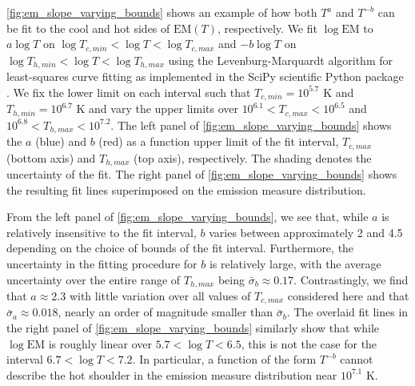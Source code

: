 \documentclass[apj]{emulateapj}
\begin{document}
	\par\autoref{fig:em_slope_varying_bounds} shows an example of how both $T^a$ and $T^{-b}$ can be fit to the cool and hot sides of $\mathrm{EM}(T)$, respectively. We fit $\log{\mathrm{EM}}$ to $a\log{T}$ on $\log{T_{c,min}}<\log{T}<\log{T_{c,max}}$ and $-b\log{T}$ on $\log{T_{h,min}}<\log{T}<\log{T_{h,max}}$ using the Levenburg-Marquardt algorithm for least-squares curve fitting as implemented in the SciPy scientific Python package \citep{van_der_walt_numpy_2011}. We fix the lower limit on each interval such that $T_{c,min}=10^{5.7}$ K and $T_{h,min} = 10^{6.7}$  K and vary the upper limits over $10^{6.1}<T_{c,max}<10^{6.5}$ and $10^{6.8}<T_{h,max}<10^{7.2}$. The left panel of \autoref{fig:em_slope_varying_bounds} shows the $a$ (blue) and $b$ (red) as a function upper limit of the fit interval, $T_{c,max}$ (bottom axis) and $T_{h,max}$ (top axis), respectively. The shading denotes the uncertainty of the fit. The right panel of \autoref{fig:em_slope_varying_bounds} shows the resulting fit lines superimposed on the emission measure distribution.
	\par From the left panel of \autoref{fig:em_slope_varying_bounds}, we see that, while $a$ is relatively insensitive to the fit interval, $b$ varies between approximately 2 and 4.5 depending on the choice of bounds of the fit interval. Furthermore, the uncertainty in the fitting procedure for $b$ is relatively large, with the average uncertainty over the entire range of $T_{h,max}$ being $\bar{\sigma}_b\approx0.17$.  Contrastingly, we find that $a\approx2.3$ with little variation over all values of $T_{c,max}$ considered here and that $\bar{\sigma}_a\approx0.018$, nearly an order of magnitude smaller than $\bar{\sigma}_b$. The overlaid fit lines in the right panel of \autoref{fig:em_slope_varying_bounds} similarly show that while $\log{\mathrm{EM}}$ is roughly linear over $5.7<\log{T}<6.5$, this is not the case for the interval $6.7<\log{T}<7.2$. In particular, a function of the form $T^{-b}$ cannot describe the hot shoulder in the emission measure distribution near $10^{7.1}$ K.
\end{document}
